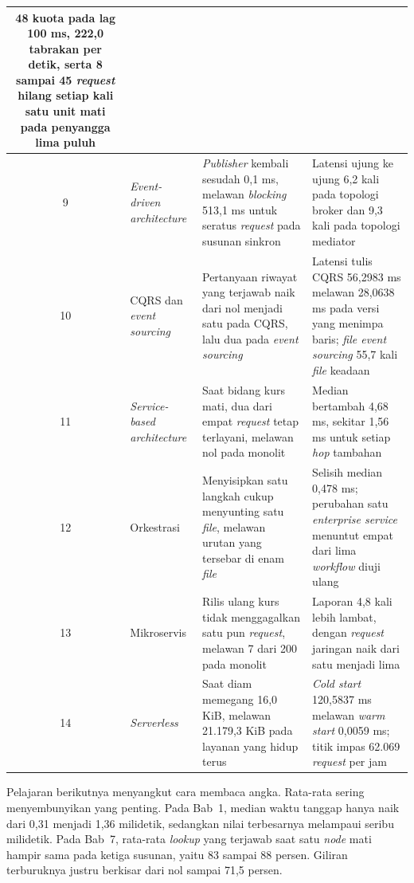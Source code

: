 \begin{table}[htbp]
\begin{tabularx}{\textwidth}{|c|>{\raggedright\arraybackslash}p{1.9cm}%
    |>{\raggedright\arraybackslash}X|>{\raggedright\arraybackslash}X|}
      48 kuota pada lag 100 ms, 222,0 tabrakan per detik, serta 8 sampai 45
      \textit{request} hilang setiap kali satu unit mati pada penyangga lima
      puluh \\
    \hline
    9 & \textit{Event-driven architecture} & \textit{Publisher} kembali sesudah
      0,1 ms, melawan \textit{blocking} 513,1 ms untuk seratus
      \textit{request} pada susunan sinkron & Latensi ujung ke ujung 6,2 kali
      pada topologi broker dan 9,3 kali pada topologi mediator \\
    \hline
    10 & CQRS dan \textit{event sourcing} & Pertanyaan riwayat yang terjawab
      naik dari nol menjadi satu pada CQRS, lalu dua pada \textit{event
      sourcing} & Latensi tulis CQRS 56,2983 ms melawan 28,0638 ms pada versi
      yang menimpa baris;
      \textit{file event sourcing} 55,7 kali \textit{file} keadaan \\
    \hline
    11 & \textit{Service-based architecture} & Saat bidang kurs mati, dua dari
      empat \textit{request} tetap terlayani, melawan nol pada monolit &
      Median bertambah 4,68 ms, sekitar 1,56 ms untuk setiap \textit{hop}
      tambahan \\
    \hline
    12 & Orkestrasi & Menyisipkan satu langkah cukup menyunting satu
      \textit{file}, melawan urutan yang tersebar di enam \textit{file} &
      Selisih median 0,478 ms; perubahan satu \textit{enterprise service}
      menuntut empat dari lima \textit{workflow} diuji ulang \\
    \hline
    13 & Mikroservis & Rilis ulang kurs tidak menggagalkan satu pun
      \textit{request}, melawan 7 dari 200 pada monolit & Laporan 4,8 kali
      lebih lambat, dengan \textit{request} jaringan naik dari satu menjadi
      lima \\
    \hline
    14 & \textit{Serverless} & Saat diam memegang 16,0 KiB, melawan 21.179,3
      KiB pada layanan yang hidup terus & \textit{Cold start} 120,5837 ms
      melawan \textit{warm start} 0,0059 ms; titik impas 62.069
      \textit{request} per jam \\
    \hline
  \end{tabularx}
\end{table}

Pelajaran berikutnya menyangkut cara membaca angka. Rata-rata sering
menyembunyikan yang penting. Pada Bab~1, median waktu tanggap hanya naik dari
0,31 menjadi 1,36 milidetik, sedangkan nilai terbesarnya melampaui seribu
milidetik. Pada Bab~7, rata-rata \textit{lookup} yang terjawab saat satu
\textit{node} mati hampir sama pada ketiga susunan, yaitu 83 sampai 88 persen.
Giliran terburuknya justru berkisar dari nol sampai 71,5 persen.

